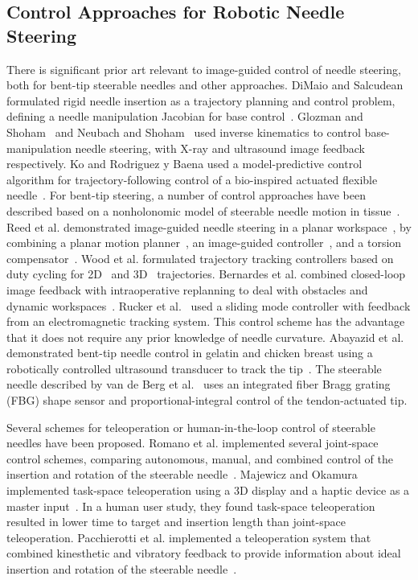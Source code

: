 \subsection{Control Approaches for Robotic Needle Steering}
There is significant prior art relevant to image-guided control of needle steering, both for bent-tip steerable needles and other approaches. DiMaio and Salcudean formulated rigid needle insertion as a trajectory planning and control problem, defining a needle manipulation Jacobian for base control~\cite{DiMaio2005}. Glozman and Shoham~\cite{Glozman2007} and Neubach and Shoham~\cite{Neubach2010} used inverse kinematics to control base-manipulation needle steering, with X-ray and ultrasound image feedback respectively. Ko and Rodriguez y Baena used a model-predictive control algorithm for trajectory-following control of a bio-inspired actuated flexible needle~\cite{Ko2012}. For bent-tip steering, a number of control approaches have been described based on a nonholonomic model of steerable needle motion in tissue~\cite{Webster2006}. Reed et al. demonstrated image-guided needle steering in a planar workspace~\cite{Reed2011}, by combining a planar motion planner~\cite{Alterovitz2008}, an image-guided controller~\cite{Kallem2009}, and a torsion compensator~\cite{Reed2009}. Wood et al. formulated trajectory tracking controllers based on duty cycling for 2D~\cite{Wood2010} and 3D~\cite{Wood2013} trajectories. Bernardes et al. combined closed-loop image feedback with intraoperative replanning to deal with obstacles and dynamic workspaces~\cite{Bernardes2013}. Rucker et al.~\cite{Rucker2013} used a sliding mode controller with feedback from an electromagnetic tracking system. This control scheme has the advantage that it does not require any prior knowledge of needle curvature. Abayazid et al. demonstrated bent-tip needle control in gelatin and chicken breast using a robotically controlled ultrasound transducer to track the tip~\cite{Abayazid2014}. The steerable needle described by van de Berg et al.~\cite{vandeBerg2015} uses an integrated fiber Bragg grating (FBG) shape sensor and proportional-integral control of the tendon-actuated tip. 

Several schemes for teleoperation or human-in-the-loop control of steerable needles have been proposed. Romano et al. implemented several joint-space control schemes, comparing autonomous, manual, and combined control of the insertion and rotation of the steerable needle~\cite{Romano2007}. Majewicz and Okamura implemented task-space teleoperation using a 3D display and a haptic device as a master input~\cite{Majewicz2013}. In a human user study, they found task-space teleoperation resulted in lower time to target and insertion length than joint-space teleoperation. Pacchierotti et al. implemented a teleoperation system that combined kinesthetic and
vibratory feedback to provide information about ideal insertion and rotation of the steerable needle~\cite{Pacchierotti2014}.

